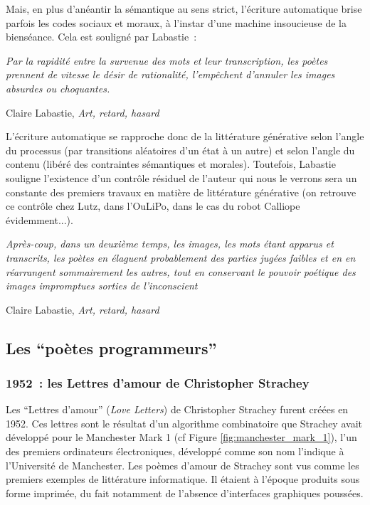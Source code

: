 \documentclass{article}
\newenvironment{citationbox}
{\begin{center}
		\begin{minipage}{.8\textwidth}
		}
		{
		\end{minipage}	
\end{center}
}
\begin{document}
				Mais, en plus d'anéantir la sémantique au sens strict, l'écriture automatique brise parfois les codes sociaux et moraux, à l'instar d'une machine insoucieuse de la bienséance. Cela est souligné par Labastie~:
				\begin{citationbox}
					\textit{Par la rapidité entre la survenue des mots et leur transcription, les poètes prennent de vitesse le désir de rationalité, l'empêchent d'annuler les images absurdes ou choquantes.}
					\begin{flushright}
						Claire Labastie, \textit{Art, retard, hasard}\cite{labastie2016}
					\end{flushright}
				\end{citationbox}
				
				L'écriture automatique se rapproche donc de la littérature générative selon l'angle du processus (par transitions aléatoires d'un état à un autre) et selon l'angle du contenu (libéré des contraintes sémantiques et morales). Toutefois, Labastie souligne l'existence d'un contrôle résiduel de l'auteur qui nous le verrons sera un constante des premiers travaux en matière de littérature générative (on retrouve ce contrôle chez Lutz, dans l'OuLiPo, dans le cas du robot Calliope évidemment...).
				\begin{citationbox}
					\textit{Après-coup, dans un deuxième temps, les images, les mots étant apparus et transcrits, les poètes en élaguent probablement des parties jugées faibles et en en réarrangent sommairement les autres, tout en conservant le pouvoir poétique des images impromptues sorties de l'inconscient}
					\begin{flushright}
						Claire Labastie, \textit{Art, retard, hasard}\cite{labastie2016}
					\end{flushright}
				\end{citationbox}
				
		\subsection{Les ``poètes programmeurs''}
			\subsubsection{1952 : les Lettres d'amour de Christopher Strachey}
				Les ``Lettres d'amour'' (\textit{Love Letters}) de Christopher Strachey furent créées en 1952. Ces lettres sont le résultat d'un algorithme combinatoire que Strachey avait développé pour le Manchester Mark 1 (cf Figure \ref{fig:manchester_mark_1}), l'un des premiers ordinateurs électroniques, développé comme son nom l'indique à l'Université de Manchester. Les poèmes d'amour de Strachey sont vus comme les premiers exemples de littérature informatique. Il étaient à l'époque produits sous forme imprimée, du fait notamment de l'absence d'interfaces graphiques poussées.
				
\end{document}

